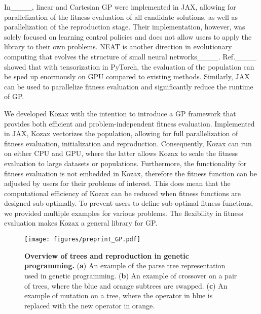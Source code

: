 In____, linear and Cartesian GP were implemented in JAX, allowing for parallelization of the fitness evaluation of all candidate solutions, as well as parallelization of the reproduction stage. Their implementation, however, was solely focused on learning control policies and does not allow users to apply the library to their own problems. NEAT is another direction in evolutionary computing that evolves the structure of small neural networks____. Ref.____ showed that with tensorization in PyTorch, the evaluation of the population can be sped up enormously on GPU compared to existing methods. Similarly, JAX can be used to parallelize fitness evaluation and significantly reduce the runtime of GP.

We developed Kozax with the intention to introduce a GP framework that provides both efficient and problem-independent fitness evaluation. Implemented in JAX, Kozax vectorizes the population, allowing for full parallelization of fitness evaluation, initialization and reproduction. Consequently, Kozax can run on either CPU and GPU, where the latter allows Kozax to scale the fitness evaluation to large datasets or populations. Furthermore, the functionality for fitness evaluation is not embedded in Kozax, therefore the fitness function can be adjusted by users for their problems of interest. This does mean that the computational efficiency of Kozax can be reduced when fitness functions are designed sub-optimally. To prevent users to define sub-optimal fitness functions, we provided multiple examples for various problems. The flexibility in fitness evaluation makes Kozax a general library for GP.

\begin{figure}[t]  %
    \centering
    \texttt{[image: figures/preprint\_GP.pdf]} %
    \caption{\textbf{Overview of trees and reproduction in genetic programming.} (\textbf{a}) An example of the parse tree representation used in genetic programming. (\textbf{b}) An example of crossover on a pair of trees, where the blue and orange subtrees are swapped. (\textbf{c}) An example of mutation on a tree, where the operator in blue is replaced with the new operator in orange.}
    \label{fig: overview}
\end{figure}